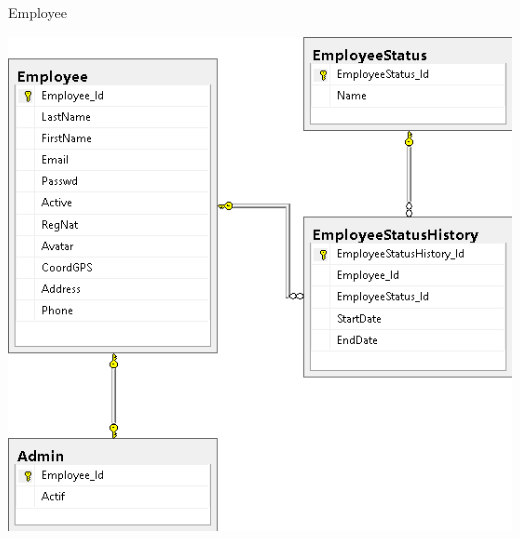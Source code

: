 \begin{frame}{Employee}
  \begin{center}
    \includegraphics[height=0.9\textheight]{images/database/Employee.png}
  \end{center}
\end{frame}